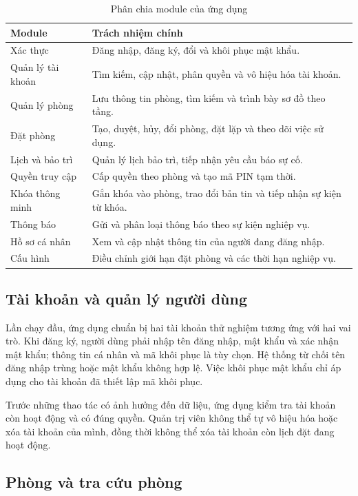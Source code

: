 \begin{table}[H]
\centering
\caption{Phân chia module của ứng dụng}
\label{tab:modules}
\small
\begin{tabularx}{\textwidth}{>{\raggedright\arraybackslash}p{4.1cm} X}
\toprule
\rowcolor{RoomHubLight}
\textbf{Module} & \textbf{Trách nhiệm chính} \\
\midrule
Xác thực & Đăng nhập, đăng ký, đổi và khôi phục mật khẩu. \\
Quản lý tài khoản & Tìm kiếm, cập nhật, phân quyền và vô hiệu hóa tài khoản. \\
Quản lý phòng & Lưu thông tin phòng, tìm kiếm và trình bày sơ đồ theo tầng. \\
Đặt phòng & Tạo, duyệt, hủy, đổi phòng, đặt lặp và theo dõi việc sử dụng. \\
Lịch và bảo trì & Quản lý lịch bảo trì, tiếp nhận yêu cầu báo sự cố. \\
Quyền truy cập & Cấp quyền theo phòng và tạo mã PIN tạm thời. \\
Khóa thông minh & Gắn khóa vào phòng, trao đổi bản tin và tiếp nhận sự kiện từ khóa. \\
Thông báo & Gửi và phân loại thông báo theo sự kiện nghiệp vụ. \\
Hồ sơ cá nhân & Xem và cập nhật thông tin của người đang đăng nhập. \\
Cấu hình & Điều chỉnh giới hạn đặt phòng và các thời hạn nghiệp vụ. \\
\bottomrule
\end{tabularx}
\end{table}

\subsection{Tài khoản và quản lý người dùng}

Lần chạy đầu, ứng dụng chuẩn bị hai tài khoản thử nghiệm tương ứng với hai vai trò. Khi đăng ký, người dùng phải nhập tên đăng nhập, mật khẩu và xác nhận mật khẩu; thông tin cá nhân và mã khôi phục là tùy chọn. Hệ thống từ chối tên đăng nhập trùng hoặc mật khẩu không hợp lệ. Việc khôi phục mật khẩu chỉ áp dụng cho tài khoản đã thiết lập mã khôi phục.

Trước những thao tác có ảnh hưởng đến dữ liệu, ứng dụng kiểm tra tài khoản còn hoạt động và có đúng quyền. Quản trị viên không thể tự vô hiệu hóa hoặc xóa tài khoản của mình, đồng thời không thể xóa tài khoản còn lịch đặt đang hoạt động.

\subsection{Phòng và tra cứu phòng}

